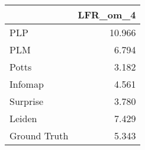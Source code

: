 \begin{tabular}{lr}
\toprule
{} & LFR_om_4 \\
\midrule
PLP          &   10.966 \\
PLM          &    6.794 \\
Potts        &    3.182 \\
Infomap      &    4.561 \\
Surprise     &    3.780 \\
Leiden       &    7.429 \\
Ground Truth &    5.343 \\
\bottomrule
\end{tabular}
